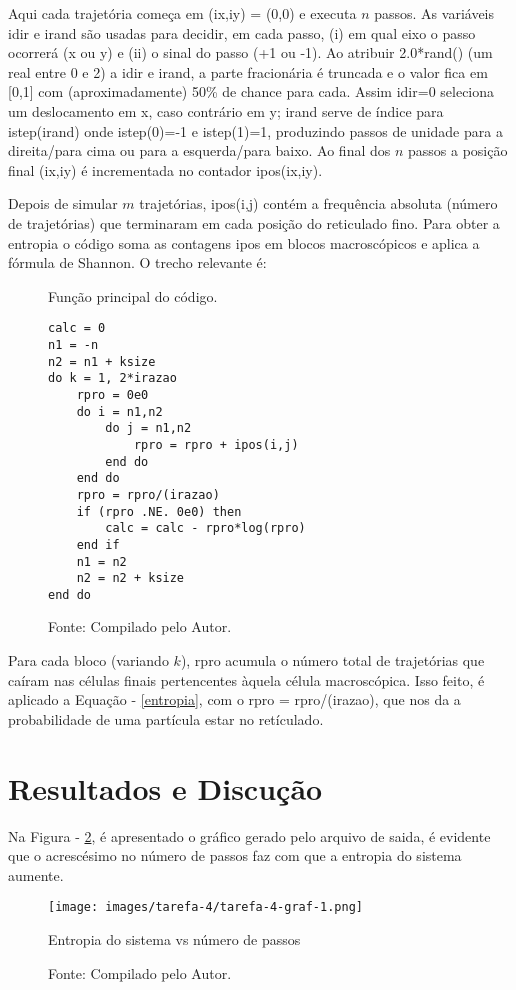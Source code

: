 Aqui cada trajetória começa em (ix,iy) = (0,0) e executa $n$ passos. As variáveis idir e irand
são usadas para decidir, em cada passo, (i) em qual eixo o passo ocorrerá (x ou y) e (ii) o sinal do passo
(+1 ou -1). Ao atribuir 2.0*rand() (um real entre 0 e 2) a idir e irand, a parte
fracionária é truncada e o valor fica em [0,1] com (aproximadamente) 50\% de chance para cada.
Assim idir=0 seleciona um deslocamento em x, caso contrário em y; irand serve de índice para
istep(irand) onde istep(0)=-1 e istep(1)=1, produzindo passos de unidade para a direita/para
cima ou para a esquerda/para baixo. Ao final dos $n$ passos a posição final (ix,iy) é incrementada
no contador ipos(ix,iy).

Depois de simular $m$ trajetórias, ipos(i,j) contém a frequência absoluta (número de trajetórias)
que terminaram em cada posição do reticulado fino. Para obter a entropia o código soma as contagens ipos em blocos macroscópicos e aplica a fórmula de Shannon. O trecho
relevante é:

\begin{figure}[h!]
\centering
\caption{Função principal do código.}
\centering
\begin{lstlisting}
calc = 0
n1 = -n
n2 = n1 + ksize
do k = 1, 2*irazao
    rpro = 0e0
    do i = n1,n2
        do j = n1,n2
            rpro = rpro + ipos(i,j)
        end do
    end do
    rpro = rpro/(irazao)
    if (rpro .NE. 0e0) then
        calc = calc - rpro*log(rpro)
    end if
    n1 = n2
    n2 = n2 + ksize
end do

\end{lstlisting}

\caption*{Fonte: Compilado pelo Autor.}
\label{fig:tarefa 4 - função que realiza os cálculos}
\end{figure}



Para cada bloco (variando $k$), rpro acumula o número total de trajetórias que caíram nas células
finais pertencentes àquela célula macroscópica. Isso feito, é aplicado a Equação - \ref{entropia}, com o rpro = rpro/(irazao),
que nos da a probabilidade de uma partícula estar no retículado.

\newpage
\section*{Resultados e Discução}

Na Figura - \ref{fig:tarefa 4 - Gráfico entropia versus número de passos}, é apresentado o gráfico gerado
pelo arquivo de saida, é evidente que o acrescésimo no número de passos faz com que a entropia do
sistema aumente.

\begin{figure}[h!]
\centering
\texttt{[image: images/tarefa-4/tarefa-4-graf-1.png]}
\caption{Entropia do sistema vs número de passos}

\caption*{Fonte: Compilado pelo Autor.}
\label{fig:tarefa 4 - Gráfico entropia versus número de passos}
\end{figure}